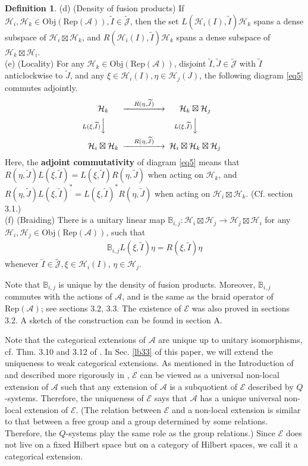 \documentclass[11pt,b5paper,notitlepage]{article}
\theoremstyle{definition}
\newtheorem{df}{Definition}[subsection]
\theoremstyle{plain}
\newcommand{\mc}{\mathcal}
\newcommand{\wtd}{\widetilde}
\newcommand{\scr}{\mathscr}
\newcommand{\Jtd}{\widetilde{\mathcal J}}
\newcommand{\RepA}{\mathrm{Rep}(\mc A)}
\newcommand{\mbb}{\mathbb}
\newcommand{\Obj}{\mathrm{Obj}}
\numberwithin{equation}{subsection}
\begin{document}
\begin{df}
	(d) (Density of fusion products) If $\mc H_i,\mc H_k\in\Obj(\RepA),\wtd I\in\Jtd$, then the set $L(\mc H_i(I),\wtd I)\mc H_k$ spans a dense subspace of $\mc H_i\boxtimes\mc H_k$, and $R(\mc H_i(I),\wtd I)\mc H_k$ spans a dense subspace of $\mc H_k\boxtimes\mc H_i$.\\
	(e) (Locality) For any $\mc H_k\in\Obj(\RepA)$, disjoint $\wtd I,\wtd J\in\Jtd$ with $\wtd I$ anticlockwise to $\wtd J$, and any $\xi\in\mc H_i(I),\eta\in\mc H_j(J)$, the following diagram \eqref{eq5}  commutes adjointly.
	\begin{align}\label{eq5}
	\begin{CD}
	\mc H_k @> \quad R(\eta,\wtd J)\quad   >> \mc H_k\boxtimes\mc H_j\\
	@V L(\xi,\wtd I)   V  V @V L(\xi,\wtd I) VV\\
	\mc H_i\boxtimes\mc H_k @> \quad R(\eta,\wtd J) \quad  >> \mc H_i\boxtimes\mc H_k\boxtimes\mc H_j
	\end{CD}
	\end{align}
	Here, the \textbf{adjoint commutativity} of diagram \eqref{eq5} means that $R(\eta,\wtd J)L(\xi,\wtd I)=L(\xi,\wtd I)R(\eta,\wtd J)$ when acting on $\mc H_k$, and $R(\eta,\wtd J)L(\xi,\wtd I)^*=L(\xi,\wtd I)^*R(\eta,\wtd J)$ when acting on $\mc H_i\boxtimes\mc H_k$. (Cf. \cite{Gui21a} section 3.1.)\\
	(f) (Braiding) There is a unitary linear map $\mbb B_{i,j}:\mc H_i\boxtimes\mc H_j\rightarrow\mc H_j\boxtimes \mc H_i$  for any $\mc H_i,\mc H_j\in\Obj(\RepA)$, such that  
	\begin{align}
	\mbb B_{i,j} L(\xi,\wtd I)\eta=R(\xi,\wtd I)\eta
	\end{align}
	whenever $\wtd I\in\Jtd,\xi\in\mc H_i(I)$, $\eta\in\mc H_j$.
\end{df}



Note that $\mbb B_{i,j}$ is unique by the density of fusion products. Moreover, $\mbb B_{i,j}$ commutes with the actions of $\mc A$, and  is the same as the braid operator of $\RepA$; see \cite{Gui21a} sections 3.2, 3.3. The existence of $\scr E$ was also proved in \cite{Gui21a} sections 3.2. A sketch of the construction can be found in \cite{Gui21b} section A. 

Note that the categorical extensions of $\mc A$ are unique up to unitary isomorphisms, cf. Thm. 3.10 and 3.12 of \cite{Gui21a}. In Sec. \ref{lb33} of this paper, we will extend the uniqueness to weak categorical extensions. As mentioned in the Introduction of \cite{Gui21a} and described more rigorously in \cite{Gui21c}, $\scr E$ can be viewed as a universal non-local extension of $\mc A$ such that any extension of $\mc A$ is a subquotient of $\scr E$ described by $Q$-systems. Therefore, the uniqueness of $\scr E$ says that $\mc A$ has a unique universal non-local extension of $\scr E$. (The relation between $\scr E$ and a non-local extension is similar to that between a free group and a group determined by some relations. Therefore, the $Q$-systems play the same role as the group relations.) Since $\scr E$ does not live on a fixed Hilbert space but on a category of Hilbert spaces, we call it a categorical extension.
\end{document}
